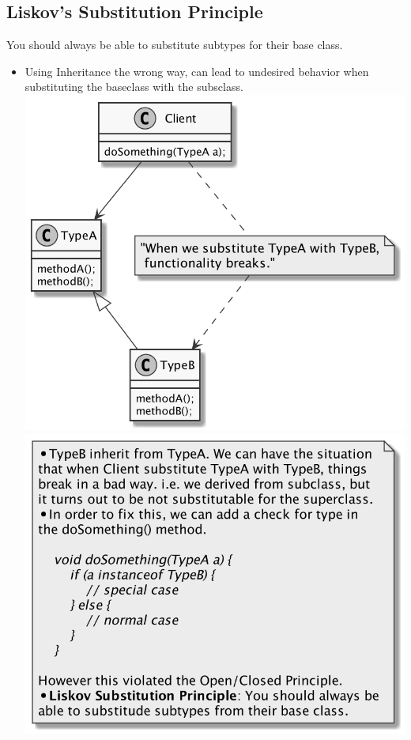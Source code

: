 \documentclass[11pt]{article}
\begin{document}
    \subsection{Liskov's Substitution Principle}
    You should always be able to substitute subtypes for their base class.
    \begin{itemize}
        \item Using Inheritance the wrong way, can lead to undesired behavior when substituting the baseclass with the
        subsclass.\\
        \includegraphics[scale=0.2]{liskov_substitution_principle}
        \includegraphics[scale=0.2]{liskov_substitution_principle2}

\end{itemize}
\end{document}
